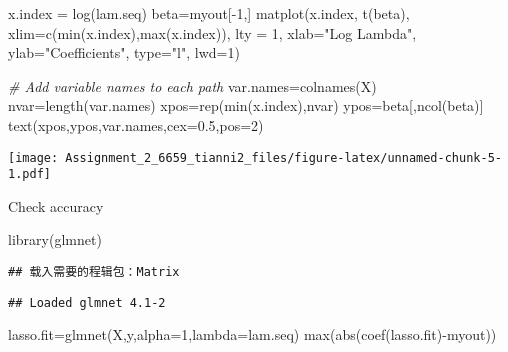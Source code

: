 \documentclass[
]{article}
\newenvironment{Shaded}{\begin{snugshade}}{\end{snugshade}}
\newcommand{\AttributeTok}[1]{\textcolor[rgb]{0.77,0.63,0.00}{#1}}
\newcommand{\CommentTok}[1]{\textcolor[rgb]{0.56,0.35,0.01}{\textit{#1}}}
\newcommand{\DecValTok}[1]{\textcolor[rgb]{0.00,0.00,0.81}{#1}}
\newcommand{\FloatTok}[1]{\textcolor[rgb]{0.00,0.00,0.81}{#1}}
\newcommand{\FunctionTok}[1]{\textcolor[rgb]{0.00,0.00,0.00}{#1}}
\newcommand{\NormalTok}[1]{#1}
\newcommand{\OtherTok}[1]{\textcolor[rgb]{0.56,0.35,0.01}{#1}}
\newcommand{\SpecialCharTok}[1]{\textcolor[rgb]{0.00,0.00,0.00}{#1}}
\newcommand{\StringTok}[1]{\textcolor[rgb]{0.31,0.60,0.02}{#1}}
\begin{document}
\begin{Shaded}
\begin{Highlighting}[]
\NormalTok{x.index }\OtherTok{=} \FunctionTok{log}\NormalTok{(lam.seq)}
\NormalTok{beta}\OtherTok{=}\NormalTok{myout[}\SpecialCharTok{{-}}\DecValTok{1}\NormalTok{,]}
\FunctionTok{matplot}\NormalTok{(x.index, }\FunctionTok{t}\NormalTok{(beta), }\AttributeTok{xlim=}\FunctionTok{c}\NormalTok{(}\FunctionTok{min}\NormalTok{(x.index),}\FunctionTok{max}\NormalTok{(x.index)),}
        \AttributeTok{lty =} \DecValTok{1}\NormalTok{, }\AttributeTok{xlab=}\StringTok{"Log Lambda"}\NormalTok{, }\AttributeTok{ylab=}\StringTok{"Coefficients"}\NormalTok{, }\AttributeTok{type=}\StringTok{"l"}\NormalTok{, }\AttributeTok{lwd=}\DecValTok{1}\NormalTok{)}

\CommentTok{\# Add variable names to each path}
\NormalTok{var.names}\OtherTok{=}\FunctionTok{colnames}\NormalTok{(X)}
\NormalTok{nvar}\OtherTok{=}\FunctionTok{length}\NormalTok{(var.names)}
\NormalTok{xpos}\OtherTok{=}\FunctionTok{rep}\NormalTok{(}\FunctionTok{min}\NormalTok{(x.index),nvar)}
\NormalTok{ypos}\OtherTok{=}\NormalTok{beta[,}\FunctionTok{ncol}\NormalTok{(beta)]}
\FunctionTok{text}\NormalTok{(xpos,ypos,var.names,}\AttributeTok{cex=}\FloatTok{0.5}\NormalTok{,}\AttributeTok{pos=}\DecValTok{2}\NormalTok{)}
\end{Highlighting}
\end{Shaded}

\texttt{[image: Assignment\_2\_6659\_tianni2\_files/figure-latex/unnamed-chunk-5-1.pdf]}

Check accuracy

\begin{Shaded}
\begin{Highlighting}[]
\FunctionTok{library}\NormalTok{(glmnet)}
\end{Highlighting}
\end{Shaded}

\begin{verbatim}
## 载入需要的程辑包：Matrix
\end{verbatim}

\begin{verbatim}
## Loaded glmnet 4.1-2
\end{verbatim}

\begin{Shaded}
\begin{Highlighting}[]
\NormalTok{lasso.fit}\OtherTok{=}\FunctionTok{glmnet}\NormalTok{(X,y,}\AttributeTok{alpha=}\DecValTok{1}\NormalTok{,}\AttributeTok{lambda=}\NormalTok{lam.seq)}
\FunctionTok{max}\NormalTok{(}\FunctionTok{abs}\NormalTok{(}\FunctionTok{coef}\NormalTok{(lasso.fit)}\SpecialCharTok{{-}}\NormalTok{myout))}
\end{Highlighting}
\end{Shaded}
\end{document}
